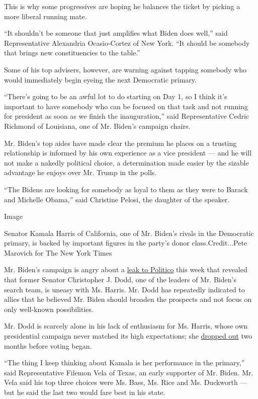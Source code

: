 This is why some progressives are hoping he balances the ticket by
picking a more liberal running mate.

``It shouldn't be someone that just amplifies what Biden does well,''
said Representative Alexandria Ocasio-Cortez of New York. ``It should be
somebody that brings new constituencies to the table.''

Some of his top advisers, however, are warning against tapping somebody
who would immediately begin eyeing the next Democratic primary.

``There's going to be an awful lot to do starting on Day 1, so I think
it's important to have somebody who can be focused on that task and not
running for president as soon as we finish the inauguration,'' said
Representative Cedric Richmond of Louisiana, one of Mr. Biden's campaign
chairs.

Mr. Biden's top aides have made clear the premium he places on a
trusting relationship is informed by his own experience as a vice
president --- and he will not make a nakedly political choice, a
determination made easier by the sizable advantage he enjoys over Mr.
Trump in the polls.

``The Bidens are looking for somebody as loyal to them as they were to
Barack and Michelle Obama,'' said Christine Pelosi, the daughter of the
speaker.

Image

Senator Kamala Harris of California, one of Mr. Biden's rivals in the
Democratic primary, is backed by important figures in the party's donor
class.Credit...Pete Marovich for The New York Times

Mr. Biden's campaign is angry about a
\href{https://www.politico.com/news/2020/07/27/kamala-harris-biden-vp-381829}{leak
to Politico} this week that revealed that former Senator Christopher J.
Dodd, one of the leaders of Mr. Biden's search team, is uneasy with Ms.
Harris. Mr. Dodd has repeatedly indicated to allies that he believed Mr.
Biden should broaden the prospects and not focus on only well-known
possibilities.

Mr. Dodd is scarcely alone in his lack of enthusiasm for Ms. Harris,
whose own presidential campaign never matched its high expectations; she
\href{https://www.nytimes3xbfgragh.onion/2019/11/29/us/politics/kamala-harris-2020.html}{dropped
out} two months before voting began.

``The thing I keep thinking about Kamala is her performance in the
primary,'' said Representative Filemon Vela of Texas, an early supporter
of Mr. Biden. Mr. Vela said his top three choices were Ms. Bass, Ms.
Rice and Ms. Duckworth --- but he said the last two would fare best in
his state.

